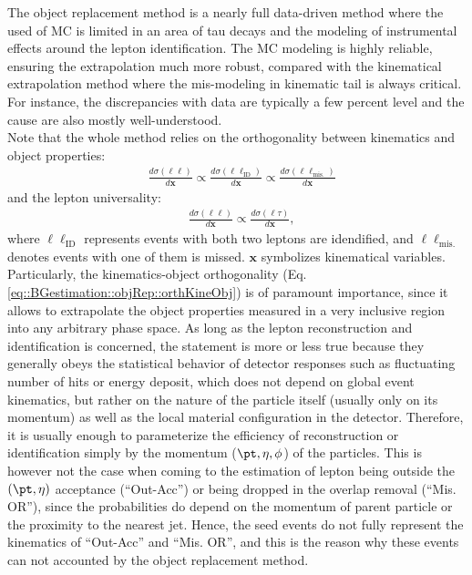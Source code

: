 %
The object replacement method is a nearly full data-driven method where the used of MC is limited in an area of tau decays and the modeling of instrumental effects around the lepton identification.
The MC modeling is highly reliable, ensuring the extrapolation much more robust, compared with the kinematical extrapolation method where the mis-modeling in kinematic tail is always critical. For instance, the discrepancies with data are typically a few percent level and the cause are also mostly well-understood. \\

Note that the whole method relies on the orthogonality between kinematics and object properties:
\begin{align}
  & \frac{d\sigma(\ell\ell)}{d\bm{x}}
  \propto \frac{d\sigma(\ell\ell_{\mathrm{ID}})}{d\bm{x}} 
  \propto \frac{d\sigma(\ell\ell_{\mathrm{mis.}})}{d\bm{x}} 
  \label{eq::BGestimation::objRep::orthKineObj}
\end{align}
and the lepton universality:
\begin{align}
  & \frac{d\sigma(\ell\ell)}{d\bm{x}}
  \propto \frac{d\sigma(\ell\tau)}{d\bm{x}},
  \label{eq::BGestimation::objRep::lepUniv}
\end{align}
where $\ell\ell_{\mathrm{ID}}$ represents events with both two leptons are idendified, and $\ell\ell_{\mathrm{mis.}}$ denotes events with one of them is missed. 
$\bm{x}$ symbolizes kinematical variables. 
Particularly, the kinematics-object orthogonality (Eq. \ref{eq::BGestimation::objRep::orthKineObj}) is of paramount importance, since it allows to extrapolate the object properties measured in a very inclusive region into any arbitrary phase space. 
As long as the lepton reconstruction and identification is concerned, the statement is more or less true
because they generally obeys the statistical behavior of detector responses such as fluctuating number of hits or energy deposit, which does not depend on global event kinematics, but rather on the nature of the particle itself (usually only on its momentum) as well as the local material configuration in the detector. Therefore, it is usually enough to parameterize the efficiency of reconstruction or identification simply by the momentum ($\pt, \eta, \phi$) of the particles. This is however not the case when coming to the estimation of lepton being outside the $(\pt,\eta)$ acceptance (``Out-Acc'') or being dropped in the overlap removal (``Mis. OR''), since the probabilities do depend on the momentum of parent particle or the proximity to the nearest jet. Hence, the seed events do not fully represent the kinematics of ``Out-Acc'' and ``Mis. OR'', and this is the reason why these events can not accounted by the object replacement method. \\

